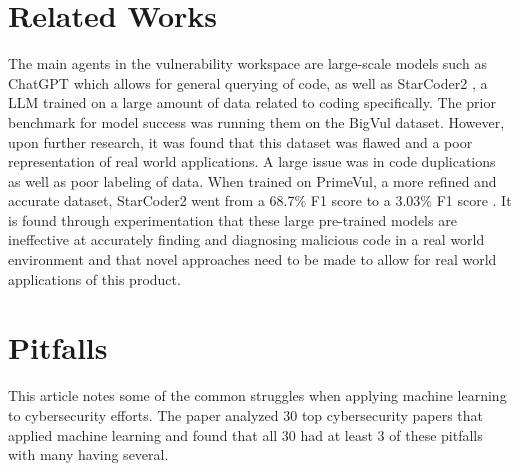 \documentclass{article}
\begin{document}
\section{Related Works}
The main agents in the vulnerability workspace are large-scale models such as ChatGPT \cite{} which allows for general querying of code, as well as StarCoder2 \cite{}, a LLM trained on a large amount of data related to coding specifically. The prior benchmark for model success was running them on the BigVul dataset. However, upon further research, it was found that this dataset was flawed and a poor representation of real world applications. A large issue was in code duplications as well as poor labeling of data. When trained on PrimeVul, a more refined and accurate dataset, StarCoder2 went from a 68.7\% F1 score to a 3.03\% F1 score \cite{ding2024vulnerabilitydetectioncodelanguage}. It is found through experimentation that these large pre-trained models are ineffective at accurately finding and diagnosing malicious code in a real world environment and that novel approaches need to be made to allow for real world applications of this product. \cite{}

\section{Pitfalls}

This article notes some of the common struggles when applying machine learning to cybersecurity efforts. The paper analyzed 30 top cybersecurity papers that applied machine learning and found that all 30 had at least 3 of these pitfalls with many having several.
\end{document}
